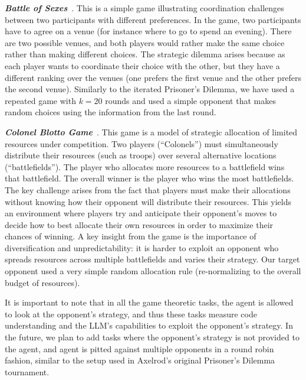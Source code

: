 \documentclass[]{fairmeta}
\newcommand{\ibold}[1]{\textbf{\textit{#1}}}
\newcommand{\dm}[1]{\colorbox{Emerald}{\textcolor{white}{Despoina}}\textcolor{Emerald}{\textbf{:#1}}}
\begin{document}
\ibold{Battle of Sexes}~\citep{cooper1989communication}. This is a simple game illustrating coordination challenges between two participants with different preferences. In the game, two participants have to agree on a venue (for instance where to go to spend an evening). There are two possible venues, and both players would rather make the same choice rather than making different choices. The strategic dilemma arises because as each player wants to coordinate their choice with the other, but they have a different ranking over the venues (one prefers the first venue and the other prefers the second venue). Similarly to the iterated Prisoner's Dilemma, we have used a repeated game with $k=20$ rounds and used a simple opponent that makes random choices using the information from the last round. 

\ibold{Colonel Blotto Game}~\citep{roberson2006colonel}. This game is a model of strategic allocation of limited resources under competition. Two players (``Colonels'') must simultaneously distribute their resources (such as troops) over several alternative locations (``battlefields''). The player who allocates more resources to a battlefield wins that battlefield. The overall winner is the player who wins the most battlefields. The key challenge arises from the fact that players must make their allocations without knowing how their opponent will distribute their resources. This yields an environment where players try and anticipate their opponent's moves to decide how to best allocate their own resources in order to maximize their chances of winning. A key insight from the game is the importance of diversification and unpredictability: it is harder to exploit an opponent who spreads resources across multiple battlefields and varies their strategy. Our target opponent used a very simple random allocation rule (re-normalizing to the overall budget of resources).

It is important to note that in all the game theoretic tasks, the agent is allowed to look at the opponent's strategy, and thus these tasks measure code understanding and the LLM's capabilities to exploit the opponent's strategy.
In the future, we plan to add tasks where the opponent's strategy is not provided to the agent, and agent is pitted against multiple opponents in a round robin fashion, similar to the setup used in Axelrod's original Prisoner's Dilemma tournament. 
\end{document}
